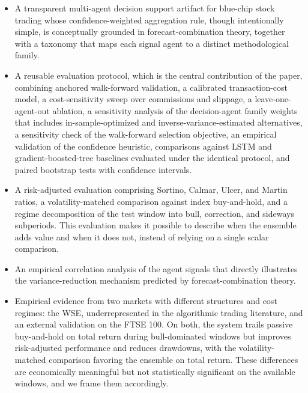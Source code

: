 \documentclass{ieeeaccess}
\begin{document}
\begin{itemize}
\item A transparent multi-agent decision support artifact for blue-chip stock trading whose confidence-weighted aggregation rule, though intentionally simple, is conceptually grounded in forecast-combination theory, together with a taxonomy that maps each signal agent to a distinct methodological family.
\item A reusable evaluation protocol, which is the central contribution of the paper, combining anchored walk-forward validation, a calibrated transaction-cost model, a cost-sensitivity sweep over commissions and slippage, a leave-one-agent-out ablation, a sensitivity analysis of the decision-agent family weights that includes in-sample-optimized and inverse-variance-estimated alternatives, a sensitivity check of the walk-forward selection objective, an empirical validation of the confidence heuristic, comparisons against LSTM and gradient-boosted-tree baselines evaluated under the identical protocol, and paired bootstrap tests with confidence intervals.
\item A risk-adjusted evaluation comprising Sortino, Calmar, Ulcer, and Martin ratios, a volatility-matched comparison against index buy-and-hold, and a regime decomposition of the test window into bull, correction, and sideways subperiods. This evaluation makes it possible to describe when the ensemble adds value and when it does not, instead of relying on a single scalar comparison.
\item An empirical correlation analysis of the agent signals that directly illustrates the variance-reduction mechanism predicted by forecast-combination theory.
\item Empirical evidence from two markets with different structures and cost regimes: the WSE, underrepresented in the algorithmic trading literature, and an external validation on the FTSE 100. On both, the system trails passive buy-and-hold on total return during bull-dominated windows but improves risk-adjusted performance and reduces drawdowns, with the volatility-matched comparison favoring the ensemble on total return. These differences are economically meaningful but not statistically significant on the available windows, and we frame them accordingly.
\end{itemize}
\end{document}
